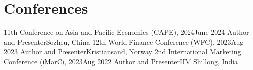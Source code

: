 \section{Conferences}
  \CVSubHeadingListStart
    \CVSubheading
      {11th Conference on Asia and Pacific Economies (CAPE), 2024}{June 2024}
      {Author and  Presenter}{Sozhou, China}
      \CVItemListStart
      \CVItemListEnd
    \CVSubheading
      {12th World Finance Conference (WFC), 2023}{Aug 2023}
      {Author and  Presenter}{Kristiansand, Norway}
      \CVItemListStart
      \CVItemListEnd
    \CVSubheading
      {2nd International Marketing Conference (iMarC), 2023}{Aug 2022}
      {Author and  Presenter}{IIM Shillong, India}
      \CVItemListStart
      \CVItemListEnd
\CVSubHeadingListEnd
